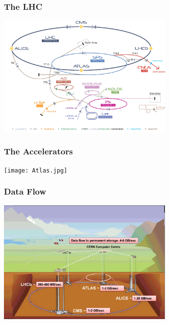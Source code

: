 \documentclass[aspectratio=169]{beamer}
\begin{document}

\begin{frame}
    \frametitle{The LHC}
    \begin{center}
        \includegraphics[width=0.65\textwidth,trim=4 4 4 4,clip]{Cern-Accelerator-Complex2.jpg}
    \end{center}
\end{frame}


\begin{frame}
    \frametitle{The Accelerators}
    \begin{center}
        \vspace{-1em}
        \texttt{[image: Atlas.jpg]}
    \end{center}
\end{frame}


\begin{frame}
    \frametitle{Data Flow}
    \begin{center}
        \vspace{-1em}
        \includegraphics[width=0.65\textwidth,trim=4 4 4 4,clip]{LHC_DataFlow.png}
    \end{center}
\end{frame}
\end{document}
